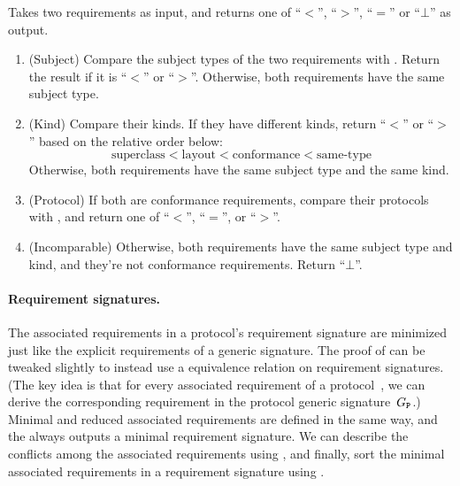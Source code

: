 \documentclass[../generics]{subfiles}
\begin{document}
\begin{algorithm}\label{requirement order}
 Takes two requirements as input, and returns one of ``$<$'', ``$>$'', ``$=$'' or \index{$\bot$}``$\bot$'' as output.
\begin{enumerate}
\item (Subject) Compare the subject types of the two requirements with . Return the result if it is ``$<$'' or ``$>$''. Otherwise, both requirements have the same subject type.
\item (Kind)  Compare their kinds. If they have different kinds, return ``$<$'' or ``$>$'' based on the relative order below:
\[\text{superclass} < \text{layout} < \text{conformance} < \text{same-type}\]
Otherwise, both requirements have the same subject type and the same kind. 
\item (Protocol) If both are conformance requirements, compare their protocols with , and return one of ``$<$'', ``$=$'', or ``$>$''.
\item (Incomparable) Otherwise, both requirements have the same subject type and kind, and they're not conformance requirements. Return ``$\bot$''.
\end{enumerate}
\end{algorithm}

\paragraph{Requirement signatures.} The associated requirements in a protocol's requirement signature are minimized just like the explicit requirements of a generic signature. The proof of  can be tweaked slightly to instead use a equivalence relation on requirement signatures. (The key idea is that for every associated requirement of a protocol~\tP, we can derive the corresponding requirement in the protocol generic signature~$G_{\texttt{P}}$.) Minimal and reduced associated requirements are defined in the same way, and the  always outputs a minimal requirement signature. We can describe the conflicts among the associated requirements using , and finally, sort the minimal associated requirements in a requirement signature using .
\end{document}

